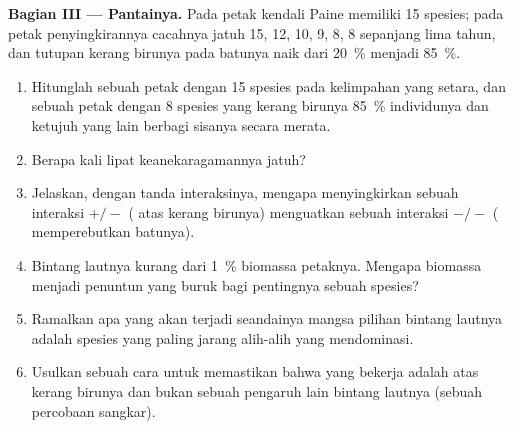 \begin{problem}
\medskip
\noindent\textbf{Bagian III --- Pantainya.}
Pada petak kendali Paine  memiliki 15 spesies; pada petak
penyingkirannya cacahnya jatuh 15, 12, 10, 9, 8, 8 sepanjang lima
tahun, dan tutupan kerang birunya pada batunya naik dari \qty{20}{\%}
menjadi \qty{85}{\%}.
\begin{enumerate}[resume]
  \item Hitunglah  sebuah petak dengan 15 spesies pada
        kelimpahan yang setara, dan sebuah petak dengan 8 spesies yang
        kerang birunya \qty{85}{\%} individunya dan ketujuh yang lain
        berbagi sisanya secara merata.
  \item Berapa kali lipat keanekaragamannya jatuh?
  \item Jelaskan, dengan tanda interaksinya, mengapa menyingkirkan
        sebuah interaksi $+/-$ ( atas kerang birunya)
        menguatkan sebuah interaksi $-/-$ ( memperebutkan
        batunya).
  \item Bintang lautnya kurang dari \qty{1}{\%} biomassa petaknya.
        Mengapa biomassa menjadi penuntun yang buruk bagi pentingnya
        sebuah spesies?
  \item Ramalkan apa yang akan terjadi seandainya mangsa pilihan
        bintang lautnya adalah spesies yang paling jarang alih-alih
        yang mendominasi.
  \item Usulkan sebuah cara untuk memastikan bahwa yang bekerja adalah
         atas kerang birunya dan bukan sebuah pengaruh lain
        bintang lautnya (sebuah percobaan sangkar).
\end{enumerate}


\end{problem}
